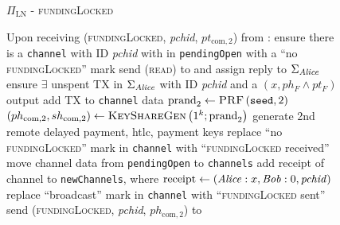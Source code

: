   \begin{figure}[H]
    \begin{protocolbox}{$\Pi_{\mathrm{LN}}$ - \textsc{fundingLocked}}
      \begin{algorithmic}[1]
        \State Upon receiving (\textsc{fundingLocked}, \textit{pchid},
        $pt_{\mathrm{com}, 2}$) from \bob:
        \Indent
          \State ensure there is a \texttt{channel} with ID \textit{pchid} with
          \bob{} in \texttt{pendingOpen} with a ``no \textsc{fundingLocked}''
          mark
           
            \State send (\textsc{read}) to \ledger{} and assign reply to
            $\Sigma_{\mathit{Alice}}$
            \State ensure $\exists$ unspent TX in $\Sigma_{\mathit{Alice}}$ with ID
            \textit{pchid} and a $\left(x, ph_F \wedge pt_F\right)$ output
            \State add TX to \texttt{channel} data
            \State $\mathrm{prand}_2 \gets \textsc{PRF}\left(\mathtt{seed},
            2\right)$
            \label{alg:protocol:fundingLocked:prand}
            \State $\left(ph_{\mathrm{com}, 2}, sh_{\mathrm{com}, 2}\right) \gets
            \textsc{KeyShareGen}\left(1^k; \mathrm{prand}_2\right)$
            \State generate 2nd remote delayed payment, htlc, payment keys
          \EndIf
          \State replace ``no \textsc{fundingLocked}'' mark in \texttt{channel}
          with ``\textsc{fundingLocked} received''
          \State move channel data from \texttt{pendingOpen} to
          \texttt{channels}
          \State add receipt of channel to \texttt{newChannels}, where
          $\mathrm{receipt} \gets (\mathit{Alice}: x, \mathit{Bob}: 0, \mathit{pchid})$
          \label{alg:protocol:fundingLocked:report}
            \State replace ``broadcast'' mark in \texttt{channel} with
            ``\textsc{fundingLocked} sent''
            \State send (\textsc{fundingLocked}, \textit{pchid},
            $ph_{\mathrm{com}, 2}$) to \bob{}
          \EndIf
        \EndIndent
      \end{algorithmic}
    \end{protocolbox}
    \caption{}
    \label{alg:protocol:fundingLocked}
  \end{figure}

